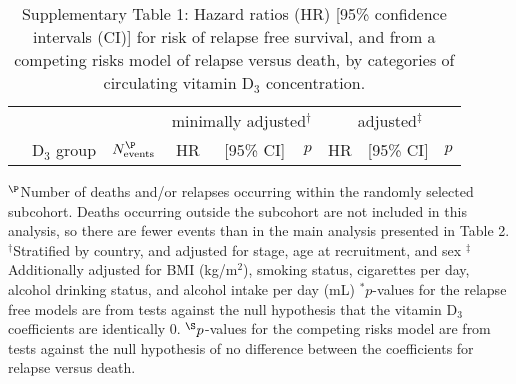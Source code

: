 \documentclass[a4paper,10pt]{article}
\begin{document}
\clearpage
\begin{table}
\caption*{Supplementary Table 1: Hazard ratios (HR) [95\% confidence intervals 
(CI)] for risk of 
relapse free survival, and from a competing risks model of relapse versus 
death, by categories of circulating vitamin D$_3$ concentration.}
\begin{tabular}{lrrrrrrrr}
\toprule
& & &\multicolumn{3}{c}{minimally adjusted$^\dag$} & 
\multicolumn{3}{c}{adjusted$^\ddag$} \\
 \cmidrule(r){4-6} \cmidrule(l){7-9} 
& D$_3$ group & $N_{\text{events}}^{\P}$ & HR & [95\% CI] & $p$ & HR & [95\% 
CI] 
& 
$p$ \\
\midrule

\bottomrule
\end{tabular}
\newline
{\footnotesize 
$^{\P}$Number of deaths and/or relapses occurring within the randomly selected 
subcohort. Deaths occurring outside the subcohort are not included in this 
analysis, so there are fewer events than in the main analysis presented in 
Table 2. \newline
$^\dag$Stratified by country, and adjusted for stage, age at recruitment, and 
sex \newline
$^\ddag$Additionally adjusted for BMI (kg/m$^2$), smoking status, cigarettes 
per day, alcohol drinking status, and alcohol intake per day (mL) \newline
$^*p$-values for the relapse free models are from tests against the null 
hypothesis that the vitamin D$_3$ coefficients are identically 0. \newline
$^{\S}p$-values for the competing risks model are from tests against the null 
hypothesis of no difference between the coefficients for relapse versus death.
}
\end{table}
\end{document}
